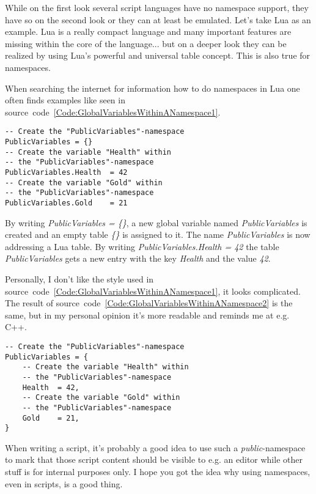 While on the first look several script languages have no namespace support, they have so on the second look or they can at least be emulated. Let's take Lua as an example. Lua is a really compact language and many important features are missing within the core of the language... but on a deeper look they can be realized by using Lua's powerful and universal table concept. This is also true for namespaces.

When searching the internet for information how to do namespaces in Lua one often finds examples like seen in source~code~\ref{Code:GlobalVariablesWithinANamespace1}.
\begin{lstlisting}[float=htb,label=Code:GlobalVariablesWithinANamespace1,caption={Global variables within a namespace (1)}]
-- Create the "PublicVariables"-namespace
PublicVariables = {}
-- Create the variable "Health" within
-- the "PublicVariables"-namespace
PublicVariables.Health	= 42
-- Create the variable "Gold" within
-- the "PublicVariables"-namespace
PublicVariables.Gold	= 21
\end{lstlisting}
By writing \emph{PublicVariables = \{\}}, a new global variable named \emph{PublicVariables} is created and an empty table \emph{\{\}} is assigned to it. The name \emph{PublicVariables} is now addressing a Lua table. By writing \emph{PublicVariables.Health = 42} the table \emph{PublicVariables} gets a new entry with the key \emph{Health} and the value \emph{42}.

Personally, I don't like the style used in source~code~\ref{Code:GlobalVariablesWithinANamespace1}, it looks complicated. The result of source~code~\ref{Code:GlobalVariablesWithinANamespace2} is the same, but in my personal opinion it's more readable and reminds me at e.g. C++.
\begin{lstlisting}[float=htb,label=Code:GlobalVariablesWithinANamespace2,caption={Global variables within a namespace (2)}]
-- Create the "PublicVariables"-namespace
PublicVariables = {
	-- Create the variable "Health" within
	-- the "PublicVariables"-namespace
	Health	= 42,
	-- Create the variable "Gold" within
	-- the "PublicVariables"-namespace
	Gold	= 21,
}
\end{lstlisting}

When writing a script, it's probably a good idea to use such a \emph{public}-namespace to mark that those script content should be visible to e.g. an editor while other stuff is for internal purposes only. I hope you got the idea why using namespaces, even in scripts, is a good thing.




